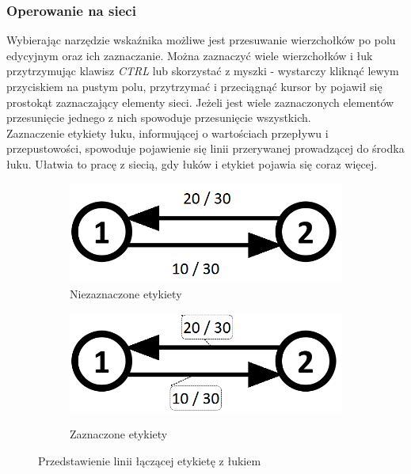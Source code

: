 \subsubsection{Operowanie na sieci}
Wybierając narzędzie wskaźnika możliwe jest przesuwanie wierzchołków po polu edycyjnym oraz ich zaznaczanie. Można zaznaczyć wiele wierzchołków i łuk przytrzymując klawisz \textit{CTRL} lub skorzystać z myszki - wystarczy kliknąć lewym przyciskiem na pustym polu, przytrzymać i przeciągnąć kursor by pojawił się prostokąt zaznaczający elementy sieci. Jeżeli jest wiele zaznaczonych elementów przesunięcie jednego z nich spowoduje przesunięcie wszystkich.\\\indent
Zaznaczenie etykiety łuku, informującej o wartościach przepływu i przepustowości, spowoduje pojawienie się linii przerywanej prowadzącej do środka łuku. Ułatwia to pracę z siecią, gdy łuków i etykiet pojawia się coraz więcej.
\begin{figure}[H]
	\centering
	\begin{subfigure}{0.45\textwidth}
		\includegraphics[width=0.9\linewidth]{./img/spec_zew05_1.png}
		\caption{Niezaznaczone etykiety}
		\label{fig:grafSelect1}
	\end{subfigure}
	\begin{subfigure}{0.45\textwidth}
		\includegraphics[width=0.9\linewidth]{./img/spec_zew05_2.png}
		\label{fig:grafSelect2}
		\caption{Zaznaczone etykiety}
	\end{subfigure}
	\caption{Przedstawienie linii łączącej etykietę z łukiem}
	\label{fig:grafSelect}
\end{figure}

